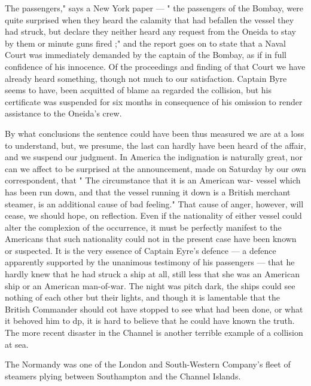 \documentclass[justified]{tufte-book}
\begin{document}
The passengers," says a New York paper — " the passengers of the Bombay, were quite surprised when they heard the calamity that had befallen the vessel they had struck, but declare they neither heard any request from the Oneida to stay by them or minute guns fired ;" and the report goes on to state that a Naval Court was immediately demanded by the captain of the Bombay, as if in full confidence of his innocence. Of the proceedings and finding of that Court we have already heard something, though not much to our satisfaction. Captain Byre seems to have, been acquitted of blame aa regarded the collision, but his certificate was suspended for six months in consequence of his omission to render assistance to the Oneida's crew. 

By what conclusions the sentence could have been thus measured we are at a loss to understand, but, we presume, the last can hardly have been heard of the affair, and we suspend our judgment. In America the indignation is naturally great, nor can we affect to be surprised at the announcement, made on Saturday by our own correspondent, that " The circumstance that it is an American war- vessel which has been run down, and that the vessel running it down is a British merchant steamer, is an additional cause of bad feeling." That cause of anger, however, will cease, we should hope, on reflection. Even if the nationality of either vessel could alter the complexion of the occurrence, it must be perfectly manifest to the Americans that such nationality could not in the present case have been known or suspected. It is the very essence of Captain Eyre's defence — a defence apparently supported by the unanimous testimony of his passengers — that he hardly knew that he had struck a ship at all, still less that she was an American ship or an American man-of-war. The night was pitch dark, the ships could see nothing of each other but their lights, and though it is lamentable that the British Commander should cot have stopped to see what had been done, or what it behoved him to dp, it is hard to believe that he could have known the truth. The more recent disaster in the Channel is another terrible example of a collision at sea. 

The Normandy was one of the London and South-Western Company's fleet of steamers plying between Southampton and the Channel Islands. 
\end{document}

